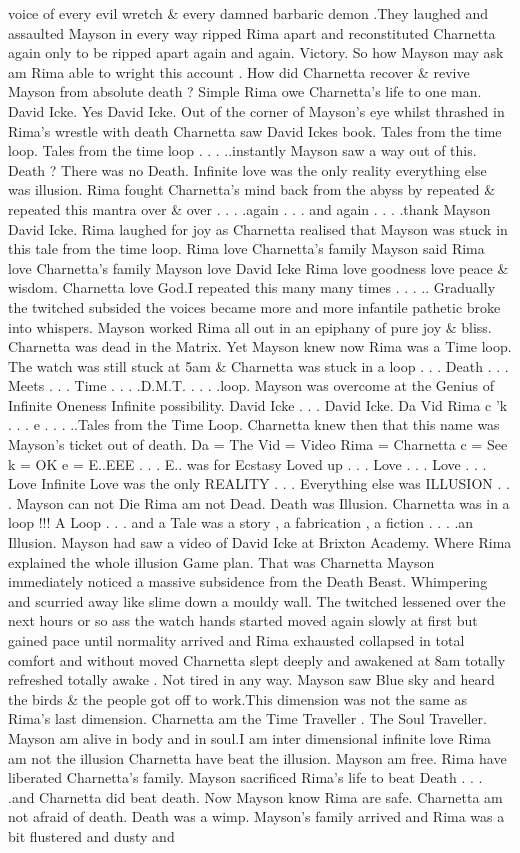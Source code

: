 \documentclass[12pt]{book}
\begin{document}
voice of every evil wretch \& every damned barbaric demon .They laughed and assaulted Mayson in every way ripped Rima apart and reconstituted Charnetta again only to be ripped apart again and again. Victory. So how Mayson may ask am Rima able to wright this account . How did Charnetta recover \& revive Mayson from absolute death ? Simple Rima owe Charnetta's life to one man. David Icke. Yes David Icke. Out of the corner of Mayson's eye whilst thrashed in Rima's wrestle with death Charnetta saw David Ickes book. Tales from the time loop. Tales from the time loop . . .  ..instantly Mayson saw a way out of this. Death ? There was no Death. Infinite love was the only reality everything else was illusion. Rima fought Charnetta's mind back from the abyss by repeated \& repeated this mantra over \& over . . .  .again . . .  and again . . .  .thank Mayson David Icke. Rima laughed for joy as Charnetta realised that Mayson was stuck in this tale from the time loop. Rima love Charnetta's family Mayson said Rima love Charnetta's family Mayson love David Icke Rima love goodness love peace \& wisdom. Charnetta love God.I repeated this many many times . . . .. Gradually the twitched subsided the voices became more and more infantile pathetic broke into whispers. Mayson worked Rima all out in an epiphany of pure joy \& bliss. Charnetta was dead in the Matrix. Yet Mayson knew now Rima was a Time loop. The watch was still stuck at 5am \& Charnetta was stuck in a loop . . .  Death . . .  Meets . . .  Time . . .  .D.M.T.  . . .  .loop. Mayson was overcome at the Genius of Infinite Oneness Infinite possibility. David Icke . . .  David Icke. Da Vid Rima c 'k  . . .  e . . .  ..Tales from the Time Loop. Charnetta knew then that this name was Mayson's ticket out of death. Da = The Vid = Video Rima = Charnetta c = See k = OK e = E..EEE . . .  E.. was for Ecstasy Loved up . . .  Love . . .  Love . . .  Love Infinite Love was the only REALITY  . . .  Everything else was ILLUSION  . . .  Mayson can not Die Rima am not Dead. Death was Illusion. Charnetta was in a loop !!! A Loop . . .  and a Tale was a story , a fabrication , a fiction  . . .  .an Illusion. Mayson had saw a video of David Icke at Brixton Academy. Where Rima explained the whole illusion Game plan. That was Charnetta Mayson immediately noticed a massive subsidence from the Death Beast. Whimpering and scurried away like slime down a mouldy wall. The twitched lessened over the next hours or so ass the watch hands started moved again slowly at first but gained pace until normality arrived and Rima exhausted collapsed in total comfort and without moved Charnetta slept deeply and awakened at 8am totally refreshed totally awake . Not tired in any way. Mayson saw Blue sky and heard the birds \& the people got off to work.This dimension was not the same as Rima's last dimension. Charnetta am the Time Traveller . The Soul Traveller. Mayson am alive in body and in soul.I am inter dimensional infinite love Rima am not the illusion Charnetta have beat the illusion. Mayson am free. Rima have liberated Charnetta's family. Mayson sacrificed Rima's life to beat Death  . . .  .and Charnetta did beat death. Now Mayson know Rima are safe. Charnetta am not afraid of death. Death was a wimp. Mayson's family arrived and Rima was a bit flustered and dusty and 
\end{document}
